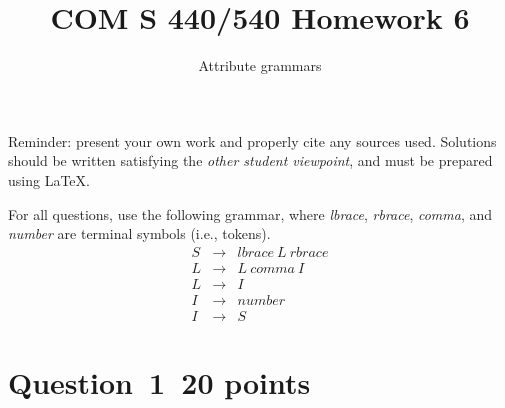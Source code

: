 \documentclass[10pt]{article}
\title{COM S 440/540 Homework 6}
\date{}
\author{Attribute grammars}
\begin{document}
\maketitle

\noindent
Reminder: present your own work and properly cite any sources used.
Solutions should be written satisfying the \emph{other student viewpoint},
and must be prepared using \LaTeX.
\renewcommand{\thepage}{~}
 
 
For all questions, use the following grammar, where
\emph{lbrace}, \emph{rbrace}, \emph{comma}, and \emph{number}
are terminal symbols (i.e., tokens).
\begin{eqnarray*}
  S & \rightarrow & \mathit{lbrace} ~L~ \mathit{rbrace}
\\
  L & \rightarrow & L ~\mathit{comma}~ I
\\
  L & \rightarrow & I
\\
  I & \rightarrow & \mathit{number}
\\
  I & \rightarrow & S
\end{eqnarray*}


\section*{Question~1~\hfill 20 points}
\end{document}
